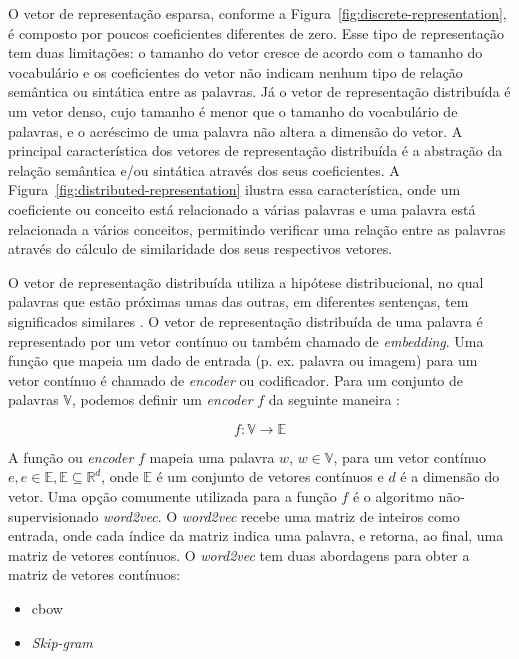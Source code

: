 O vetor de representação esparsa, conforme a Figura~\ref{fig:discrete-representation}, é composto por poucos coeficientes diferentes de zero. Esse tipo de representação tem duas limitações: o tamanho do vetor cresce de acordo com o tamanho do vocabulário e os coeficientes do vetor não indicam nenhum tipo de relação semântica ou sintática entre as palavras. Já o vetor de representação distribuída é um vetor denso, cujo tamanho é menor que o tamanho do vocabulário de palavras, e o acréscimo de uma palavra não altera a dimensão do vetor. A principal característica dos vetores de representação distribuída é a abstração da relação semântica e/ou sintática através dos seus coeficientes. A Figura~\ref{fig:distributed-representation} ilustra essa característica, onde um coeficiente ou conceito está relacionado a várias palavras e uma palavra está relacionada a vários conceitos, permitindo verificar uma relação entre as palavras através do cálculo de similaridade dos seus respectivos vetores.

 O vetor de representação distribuída utiliza a hipótese distribucional, no qual palavras que estão próximas umas das outras, em diferentes sentenças, tem significados similares \citep{Goodfellow-et-al-2016}. O vetor de representação distribuída de uma palavra é representado por um vetor contínuo ou também chamado de \textit{embedding}. Uma função que mapeia um dado de entrada (p. ex. palavra ou imagem) para um vetor contínuo é chamado de \textit{encoder} ou codificador. Para um conjunto de palavras $\mathbb{V}$, podemos definir um \textit{encoder} $f$ da seguinte maneira \citep{cambronero-deep-learning-code-search:2019}:

\begin{equation}
    f: \mathbb{V} \rightarrow \mathbb{E}
\end{equation}

A função ou \textit{encoder} $f$ mapeia uma palavra $w$, $w \in \mathbb{V}$, para um vetor contínuo $e, e \in \mathbb{E}, \mathbb{E }\subseteq \mathbb{R}^{d}$, onde $\mathbb{E}$ é um conjunto de vetores contínuos e $d$ é a dimensão do vetor. Uma opção comumente utilizada para a função $f$ é o algoritmo não-supervisionado \textit{word2vec}. O \textit{word2vec} recebe uma matriz de inteiros como entrada, onde cada índice da matriz indica uma palavra, e retorna, ao final, uma matriz de vetores contínuos. O \textit{word2vec} tem duas abordagens para obter a matriz de vetores contínuos:

\begin{itemize}
    \item \acrlong{cbow}
    \item \textit{Skip-gram}
\end{itemize}
 
